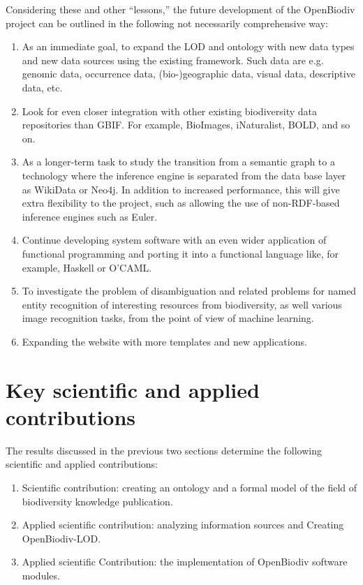 Considering these and other ``lessons,'' the future development of the OpenBiodiv project can be outlined in the following not necessarily comprehensive way:

\begin{enumerate}
    \item As an immediate goal, to expand the LOD and ontology with new data types and new data sources using the existing framework. Such data are e.g. genomic data, occurrence data, (bio-)geographic data, visual data, descriptive data, etc.
    \item Look for even closer integration with other existing biodiversity data repositories than GBIF. For example, BioImages, iNaturalist, BOLD, and so on.
    \item As a longer-term task to study the transition from a semantic graph to a technology where the inference engine is separated from the data base layer as WikiData or Neo4j. In addition to increased performance, this will give extra flexibility to the project, such as allowing the use of non-RDF-based inference engines such as Euler.
    \item Continue developing system software with an even wider application of functional programming and porting it into a functional language like, for example, Haskell or O'CAML.
    \item To investigate the problem of disambiguation and related problems for named entity recognition of interesting resources from biodiversity, as well various image recognition tasks, from the point of view of machine learning.
    \item Expanding the website with more templates and new applications.
\end{enumerate}

\section*{Key scientific and applied contributions}

The results discussed in the previous two sections determine the following scientific and applied contributions:

\begin{enumerate}
    \item Scientific contribution: creating an ontology and a formal model of the field of biodiversity knowledge publication.
    \item Applied scientific contribution: analyzing information sources and Creating OpenBiodiv-LOD.
    \item Applied scientific Contribution: the implementation of OpenBiodiv software modules.
\end{enumerate}

